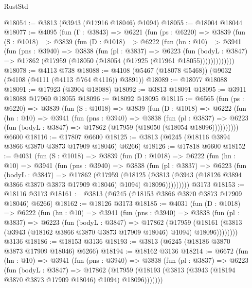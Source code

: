 \begin{lexlean}{RustStd}
\begin{coremodule}
{\begin{coremodule}
{{{{{{{{{{{{{{{{{{{{{{{{{{{{{{{{{{{@18054 := @3813 (@3943 (@17916 @18046) @1094)
@18055 := @18004 @18044
@18077 := @4095
    (fun (Γ : @3843) =>
    @6221
      (fun (ps : @6220) =>
      @3839
        (fun (S : @1018) =>
        @3839
          (fun (D : @1018) =>
          @6222
            (fun (hn : @10) =>
            @3941
              (fun (pns : @3940) =>
              @3838
                (fun (pl : @3837) =>
                @6223
                  (fun (bodyL : @3847) =>
                  @17862 (@17959 (@18050 (@18054 (@17925 (@17961 @18055)))))))))))))
@18078 := @4113 @738
@18088 := @4108 (@5467 (@18078 @5468)) (@9032 (@4108 (@4111 (@4113 @764 @4116)) @3891))
@18089 := @18077 @18088
@18091 := @17923 (@3904 @18088)
@18092 := @3813 @18091
@18095 := @3911 @18088 @17960 @18055
@18096 := @18092 @18095
@18115 := @6565
    (fun (ps : @6220) =>
    @3839
      (fun (S : @1018) =>
      @3839
        (fun (D : @1018) =>
        @6222
          (fun (hn : @10) =>
          @3941
            (fun (pns : @3940) =>
            @3838
              (fun (pl : @3837) =>
              @6223 (fun (bodyL : @3847) => @17862 (@17959 (@18050 (@18054 @18096))))))))))
    @6600
@18116 := @17807 @6600
@18125 := @3813 (@6245 (@18116 @3894 @3866 @3870 @3873 @17909 @18046) @6266)
@18126 := @17818 @6600
@18152 := @4031
    (fun (S : @1018) =>
    @3839
      (fun (D : @1018) =>
      @6222
        (fun (hn : @10) =>
        @3941
          (fun (pns : @3940) =>
          @3838
            (fun (pl : @3837) =>
            @6223
              (fun (bodyL : @3847) =>
              @17862
                (@17959
                  (@18125
                    (@3813
                      (@3943 (@18126 @3894 @3866 @3870 @3873 @17909 @18046) @1094)
                      @18096)))))))))
    @3173
@18153 := @18116 @3173
@18161 := @3813 (@6245 (@18153 @3866 @3870 @3873 @17909 @18046) @6266)
@18162 := @18126 @3173
@18185 := @4031
    (fun (D : @1018) =>
    @6222
      (fun (hn : @10) =>
      @3941
        (fun (pns : @3940) =>
        @3838
          (fun (pl : @3837) =>
          @6223
            (fun (bodyL : @3847) =>
            @17862
              (@17959
                (@18161 (@3813 (@3943 (@18162 @3866 @3870 @3873 @17909 @18046) @1094) @18096))))))))
    @3136
@18186 := @18153 @3136
@18193 := @3813 (@6245 (@18186 @3870 @3873 @17909 @18046) @6266)
@18194 := @18162 @3136
@18214 := @6672
    (fun (hn : @10) =>
    @3941
      (fun (pns : @3940) =>
      @3838
        (fun (pl : @3837) =>
        @6223
          (fun (bodyL : @3847) =>
          @17862
            (@17959 (@18193 (@3813 (@3943 (@18194 @3870 @3873 @17909 @18046) @1094) @18096)))))))
}}}}}}}}}}}}}}}}}}}}}}}}}}}}}}}}}}}
\end{coremodule}}
\end{coremodule}
\end{lexlean}
